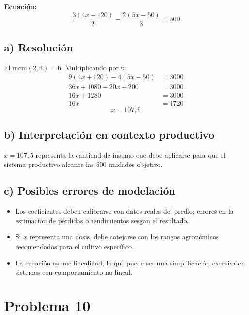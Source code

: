 \documentclass[12pt]{article}
\begin{document}
	\textbf{Ecuación:}
	\[
	\frac{3(4x + 120)}{2} - \frac{2(5x - 50)}{3} = 500
	\]
	
	\subsection*{a) Resolución}
	
	El $\text{mcm}(2,3) = 6$. Multiplicando por $6$:
	\begin{align*}
		9(4x + 120) - 4(5x - 50) &= 3000 \\
		36x + 1080 - 20x + 200   &= 3000 \\
		16x + 1280               &= 3000 \\
		16x                      &= 1720
	\end{align*}
	\[
	\boxed{x = 107{,}5}
	\]
	
	\subsection*{b) Interpretación en contexto productivo}
	
	$x = 107{,}5$ representa la cantidad de insumo que debe aplicarse para que
	el sistema productivo alcance las 500 unidades objetivo.
	
	\subsection*{c) Posibles errores de modelación}
	
	\begin{itemize}
		\item Los coeficientes deben calibrarse con datos reales del predio; errores
		en la estimación de pérdidas o rendimientos sesgan el resultado.
		\item Si $x$ representa una dosis, debe cotejarse con los rangos agronómicos
		recomendados para el cultivo específico.
		\item La ecuación asume linealidad, lo que puede ser una simplificación
		excesiva en sistemas con comportamiento no lineal.
	\end{itemize}
	
	\bigskip
	
	\section*{Problema 10}
	
\end{document}
